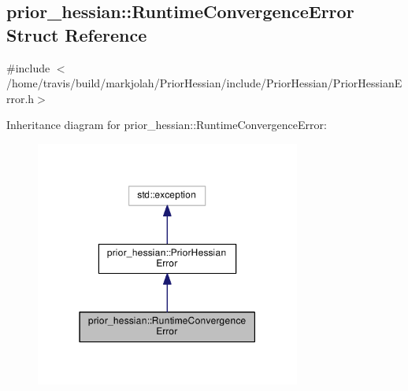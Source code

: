 \hypertarget{structprior__hessian_1_1RuntimeConvergenceError}{}\subsection{prior\+\_\+hessian\+:\+:Runtime\+Convergence\+Error Struct Reference}
\label{structprior__hessian_1_1RuntimeConvergenceError}


{\ttfamily \#include $<$/home/travis/build/markjolah/\+Prior\+Hessian/include/\+Prior\+Hessian/\+Prior\+Hessian\+Error.\+h$>$}



Inheritance diagram for prior\+\_\+hessian\+:\+:Runtime\+Convergence\+Error\+:\nopagebreak
\begin{figure}[H]
\begin{center}
\leavevmode
\includegraphics[width=247pt]{structprior__hessian_1_1RuntimeConvergenceError__inherit__graph}
\end{center}
\end{figure}


